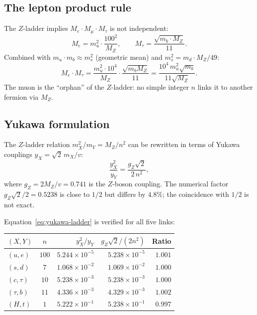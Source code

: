 \documentclass[11pt]{article}
\begin{document}
\subsection{The lepton product rule}

The $Z$-ladder implies $M_e \cdot M_\mu \cdot M_\tau$
is not independent:
\begin{equation}
  M_e = m_u^2 \cdot \frac{100^2}{M_Z},
  \qquad
  M_\tau = \frac{\sqrt{m_b\cdot M_Z}}{11}.
\end{equation}
Combined with $m_u \cdot m_b \approx m_s^2$ (geometric mean)
and $m_s^2 = m_d \cdot M_Z/49$:
\begin{equation}
  M_e \cdot M_\tau
  = \frac{m_u^2 \cdot 10^4}{M_Z} \cdot \frac{\sqrt{m_b M_Z}}{11}
  = \frac{10^4\,m_u^2\sqrt{m_b}}{11\sqrt{M_Z}}.
\end{equation}
The muon is the ``orphan'' of the $Z$-ladder: no simple
integer $n$ links it to another fermion via $M_Z$.

\subsection{Yukawa formulation}

The $Z$-ladder relation $m_X^2/m_Y = M_Z/n^2$ can be
rewritten in terms of Yukawa couplings $y_X = \sqrt{2}\,m_X/v$:
\begin{equation}
  \boxed{\frac{y_X^2}{y_Y}
  = \frac{g_Z\sqrt{2}}{2\,n^2},}
  \label{eq:yukawa-ladder}
\end{equation}
where $g_Z = 2M_Z/v = 0.741$ is the $Z$-boson coupling.
The numerical factor $g_Z\sqrt{2}/2 = 0.5238$ is close to
$1/2$ but differs by $4.8\%$; the coincidence with $1/2$ is
not exact.

Equation~\eqref{eq:yukawa-ladder} is verified for all five
links:

\begin{center}\small
\begin{tabular}{@{}l c r r r@{}}
\toprule
$(X,Y)$ & $n$ & $y_X^2/y_Y$ & $g_Z\sqrt{2}/(2n^2)$ & Ratio \\
\midrule
$(u,e)$ & $100$ & $5.244\times 10^{-5}$ & $5.238\times 10^{-5}$ & $1.001$ \\
$(s,d)$ & $7$ & $1.068\times 10^{-2}$ & $1.069\times 10^{-2}$ & $1.000$ \\
$(c,\tau)$ & $10$ & $5.238\times 10^{-3}$ & $5.238\times 10^{-3}$ & $1.000$ \\
$(\tau,b)$ & $11$ & $4.336\times 10^{-3}$ & $4.329\times 10^{-3}$ & $1.002$ \\
$(H,t)$ & $1$ & $5.222\times 10^{-1}$ & $5.238\times 10^{-1}$ & $0.997$ \\
\bottomrule
\end{tabular}
\end{center}
\end{document}
